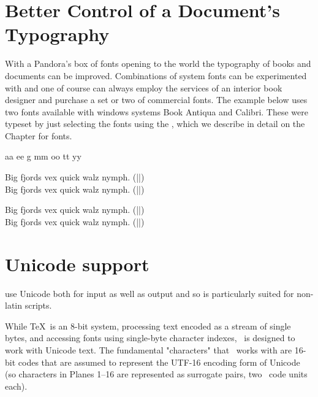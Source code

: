 \section{Better Control of a Document's Typography}

With a Pandora's box of fonts opening to the \latex world the typography of books and documents can be improved. Combinations of system fonts can be experimented with and one of course can always employ the services of an interior book designer and purchase a set or two of commercial fonts. The example below uses two fonts available with windows systems Book Antiqua and Calibri. These were typeset by just selecting the fonts using the \cmd{\fontspec}, which we describe in detail on the Chapter for fonts.
\bigskip

\newfontfamily{}
\newfontfamily{}

\centerline{
\color{gray}\huge{\antiqua a}a {\antiqua e}\calibri e \calibri g \antiqua m\calibri m 
\antiqua o{\calibri o} {\antiqua t}{\calibri t} {\antiqua y}{\calibri y}
}
 
\medskip

\begin{multicols}{2}
\bgroup
{}
 Big fjords vex quick walz nymph. (|\large|)\\
 Big fjords vex quick walz nymph. (|\small|)\\
\lorem 

\columnbreak
 Big fjords vex quick walz nymph. (|\large|)\\
 Big fjords vex quick walz nymph. (|\small|)\\
\lorem
\egroup
\end{multicols}



\section{Unicode support}

\XeTeX use Unicode both for input as well as output and so is particularly suited for non-latin scripts.

While \TeX\ is an 8-bit system, processing text encoded as a stream of single bytes, and accessing fonts using single-byte character indexes, \XeTeX\ is designed to work with Unicode text. The fundamental "characters" that \XeTeX\ works with are 16-bit codes that are assumed to represent the UTF-16 encoding form of Unicode (so characters in Planes 1–16 are represented as surrogate pairs, two \XeTeX\ code units each).


